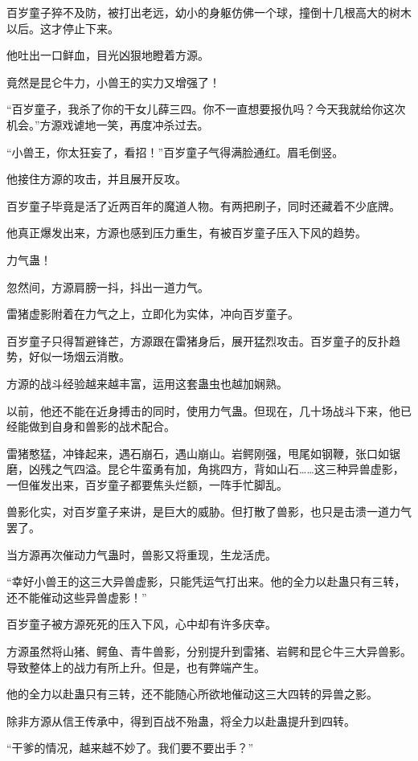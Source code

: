 \begin{this_body}
百岁童子猝不及防，被打出老远，幼小的身躯仿佛一个球，撞倒十几根高大的树木以后。这才停止下来。

他吐出一口鲜血，目光凶狠地瞪着方源。

竟然是昆仑牛力，小兽王的实力又增强了！

“百岁童子，我杀了你的干女儿薛三四。你不一直想要报仇吗？今天我就给你这次机会。”方源戏谑地一笑，再度冲杀过去。

“小兽王，你太狂妄了，看招！”百岁童子气得满脸通红。眉毛倒竖。

他接住方源的攻击，并且展开反攻。

百岁童子毕竟是活了近两百年的魔道人物。有两把刷子，同时还藏着不少底牌。

他真正爆发出来，方源也感到压力重生，有被百岁童子压入下风的趋势。

力气蛊！

忽然间，方源肩膀一抖，抖出一道力气。

雷猪虚影附着在力气之上，立即化为实体，冲向百岁童子。

百岁童子只得暂避锋芒，方源跟在雷猪身后，展开猛烈攻击。百岁童子的反扑趋势，好似一场烟云消散。

方源的战斗经验越来越丰富，运用这套蛊虫也越加娴熟。

以前，他还不能在近身搏击的同时，使用力气蛊。但现在，几十场战斗下来，他已经能做到自身和兽影的战术配合。

雷猪憨猛，冲锋起来，遇石崩石，遇山崩山。岩鳄刚强，甩尾如钢鞭，张口如锯磨，凶残之气四溢。昆仑牛蛮勇有加，角挑四方，背如山石……这三种异兽虚影，一但催发出来，百岁童子都要焦头烂额，一阵手忙脚乱。

兽影化实，对百岁童子来讲，是巨大的威胁。但打散了兽影，也只是击溃一道力气罢了。

当方源再次催动力气蛊时，兽影又将重现，生龙活虎。

“幸好小兽王的这三大异兽虚影，只能凭运气打出来。他的全力以赴蛊只有三转，还不能催动这些异兽虚影！”

百岁童子被方源死死的压入下风，心中却有许多庆幸。

方源虽然将山猪、鳄鱼、青牛兽影，分别提升到雷猪、岩鳄和昆仑牛三大异兽影。导致整体上的战力有所上升。但是，也有弊端产生。

他的全力以赴蛊只有三转，还不能随心所欲地催动这三大四转的异兽之影。

除非方源从信王传承中，得到百战不殆蛊，将全力以赴蛊提升到四转。

“干爹的情况，越来越不妙了。我们要不要出手？”


\end{this_body}
